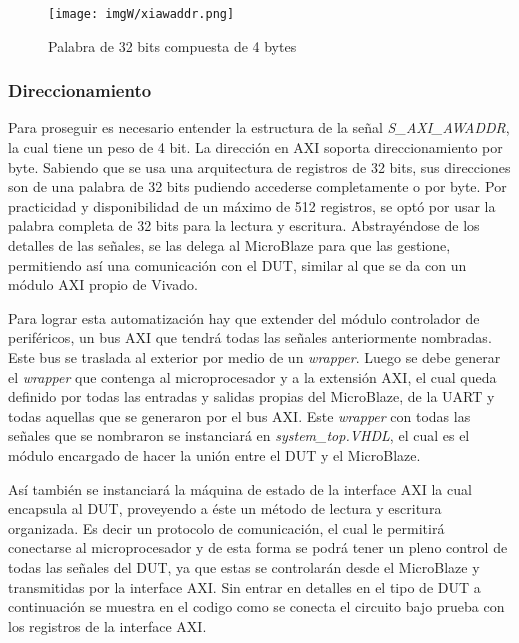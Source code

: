 \documentclass[a4paper,openright,12pt]{report}
\begin{document}
\begin{figure}[H]
	\centering
	\texttt{[image: imgW/xiawaddr.png]}
	\caption{Palabra de 32 bits compuesta de 4 bytes}
	\label{AXI}
    \end{figure}
    
    \subsubsection{Direccionamiento}
    Para proseguir es necesario entender la estructura de la señal \textit{S\_AXI\_AWADDR}, la cual tiene un peso de 4 bit. La dirección en AXI soporta direccionamiento por byte. Sabiendo que se usa una arquitectura de registros de 32 bits, sus direcciones son de una palabra de 32 bits pudiendo accederse completamente o por byte. Por practicidad y disponibilidad de un máximo de 512 registros, se optó por usar la palabra completa de 32 bits para la lectura y escritura. Abstrayéndose de los detalles de las señales, se las delega al  MicroBlaze para que las gestione,  permitiendo así una comunicación con el  DUT,  similar al que se da con  un módulo AXI propio de Vivado.
    
 Para lograr esta automatización  hay que extender del módulo controlador de periféricos,  un bus AXI que tendrá todas las señales anteriormente nombradas. Este bus se traslada al exterior por medio de un \textit{wrapper}.  Luego se debe generar el \textit{wrapper} que contenga al microprocesador y a la extensión AXI, el cual queda definido por todas las entradas y salidas propias del MicroBlaze, de la UART y todas aquellas que se generaron por el bus AXI. 
    Este \textit{wrapper} con todas las señales que se  nombraron se  instanciará  en \textit{system\_top.VHDL}, el cual es el módulo encargado de hacer la unión entre el DUT y el MicroBlaze.
    
 Así también se instanciará la máquina de estado de la interface AXI la cual encapsula al DUT, proveyendo a éste un método de lectura y escritura organizada. Es decir un protocolo de comunicación, el cual le permitirá conectarse al microprocesador y de esta forma se podrá tener un pleno control de todas las señales del DUT, ya que estas se controlarán desde el MicroBlaze y transmitidas por la interface AXI.
    Sin entrar en detalles en el tipo de DUT a continuación se muestra en el codigo como se conecta el circuito bajo prueba con los registros de la interface AXI.
    
\end{document}
